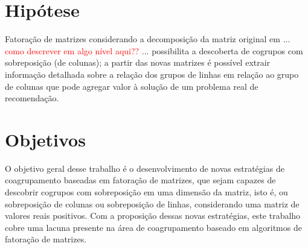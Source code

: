 \documentclass[
    12pt,                %
    oneside,            %
    a4paper,            %
    english,            %
    brazil                %
    ]{abntex2ppgsi}
\begin{document}





\section{Hipótese}

Fatoração de matrizes considerando a decomposição da matriz original em ... \textcolor{red}{como descrever em algo nível aqui??} ... possibilita a descoberta de cogrupos com sobreposição (de colunas); a partir das novas matrizes é possível extrair informação detalhada sobre a relação dos grupos de linhas em relação ao grupo de colunas que pode agregar valor à solução de um problema real de recomendação.



\section{Objetivos}

O objetivo geral desse trabalho é o desenvolvimento de novas estratégias de coagrupamento baseadas em fatoração de matrizes, que sejam capazes de descobrir cogrupos com sobreposição em uma dimensão da matriz, isto é, ou sobreposição de colunas ou sobreposição de linhas, considerando uma matriz de valores reais positivos. Com a proposição dessas novas estratégias, este trabalho cobre uma lacuna presente na área de coagrupamento baseado em algoritmos de fatoração de matrizes.
\end{document}
